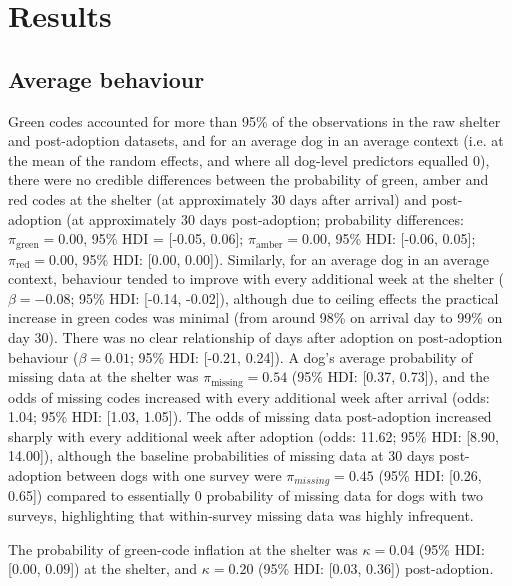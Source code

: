 \documentclass[12pt]{article}
\begin{document}
\section{Results}

\subsection{Average behaviour}
Green codes accounted for more than 95\% of the observations in the raw shelter and post-adoption datasets, and for an average dog in an average context (i.e. at the mean of the random effects, and where all dog-level predictors equalled 0), there were no credible differences between the probability of green, amber and red codes at the shelter (at approximately 30 days after arrival) and post-adoption (at approximately 30 days post-adoption; probability differences: $\pi_{\text{green}} = 0.00$, 95\% HDI = [-0.05, 0.06]; $\pi_{\text{amber}} = 0.00$, 95\% HDI: [-0.06, 0.05]; $\pi_{\text{red}} = 0.00$, 95\% HDI: [0.00, 0.00]). Similarly, for an average dog in an average context, behaviour tended to improve with every additional week at the shelter ($\beta = -0.08$; 95\% HDI: [-0.14, -0.02]), although due to ceiling effects the practical increase in green codes was minimal (from around 98\% on arrival day to 99\% on day 30). There was no clear relationship of days after adoption on post-adoption behaviour ($\beta = 0.01$; 95\% HDI: [-0.21, 0.24]). A dog's average probability of missing data at the shelter was $\pi_{\text{missing}} = 0.54$ (95\% HDI: [0.37, 0.73]), and the odds of missing codes increased with every additional week after arrival (odds: 1.04; 95\% HDI: [1.03, 1.05]). The odds of missing data post-adoption increased sharply with every additional week after adoption (odds: 11.62; 95\% HDI: [8.90, 14.00]), although the baseline probabilities of missing data at 30 days post-adoption between dogs with one survey were $\pi_{missing} = 0.45$ (95\% HDI: [0.26, 0.65]) compared to essentially 0 probability of missing data for dogs with two surveys, highlighting that within-survey missing data was highly infrequent.

The probability of green-code inflation at the shelter was $\kappa = 0.04$ (95\% HDI: [0.00, 0.09]) at the shelter, and $\kappa = 0.20$ (95\% HDI: [0.03, 0.36]) post-adoption.
\end{document}
